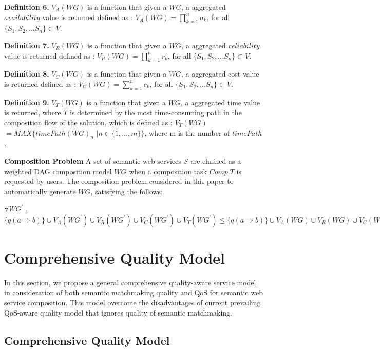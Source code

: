 \documentclass{llncs}
\begin{document}
\textbf{Definition 6.} $V_{A}(WG)$ is a function that given a $WG$, a aggregated $availability$ value is returned defined as :
$V_{A}(WG)=\prod\limits^n_{k=1}a_k$, for all $\{S_1, S_2, ... S_n\} \subset V$.

\textbf{Definition 7.} $V_{R}(WG)$ is a function that given a $WG$, a aggregated $reliability$ value is returned defined as :
$V_{R}(WG)=\prod\limits^n_{k=1}r_k$, for all $\{S_1, S_2, ... S_n\} \subset V$.

\textbf{Definition 8.} $V_{C}(WG)$ is a function that given a $WG$, a aggregated cost value is returned defined as :
$V_{C}(WG)=\sum\limits^n_{k=1}c_k$, for all $\{S_1, S_2, ... S_n\} \subset V$.


\textbf{Definition 9.} $V_{T}(WG)$ is a function that given a $WG$, a aggregated time value is returned, where  $T$ is determined by the most time-consuming path in the composition flow of the solution, which is defined as :
$V_{T}(WG)$ $=MAX\{timePath(WG)_n$ $|n\in\{1,\ldots,m\}\}$, where m is the number of $timePath$.

\vspace{0.5cm}

\textbf{Composition Problem}
A set of semantic web services $S$ are chained as a weighted DAG composition model $WG$ when a composition task $Comp.T$ is requested by users. The composition problem considered in this paper to automatically generate $WG$, satisfying the follows:

$\forall WG^{'}$ , $\{q(a \Rightarrow b) \} \cup V_{A}(WG^{'}) \cup V_{R}(WG^{'}) \cup V_{C}(WG^{'}) \cup V_{T}(WG^{'})  \leq \{ q(a \Rightarrow b) \} \cup V_{A}(WG) \cup V_{R}(WG) \cup V_{C}(WG) \cup V_{T}(WG) $ 





\section{Comprehensive Quality Model}\label{Comprehensive_Quality_Model}
In this section, we propose a general comprehensive quality-aware service model in consideration of both semantic matchmaking quality and QoS for semantic web service composition. This model overcome the disadvantages of current prevailing QoS-aware quality model that ignores quality of semantic matchmaking.


\subsection{Comprehensive Quality Model}\label{qualityModel}
\end{document}
